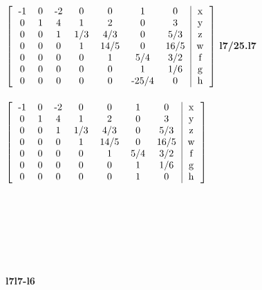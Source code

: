 \documentclass{article}
\begin{document}
\begin{hbox}{

$\left[
\begin{tabular}{ccccccc|c}
-1 & 0 & -2 & 0 & 0 & 1 & 0 & x\\
0 & 1 & 4 & 1 & 2 & 0 & 3 & y\\
0 & 0 & 1 & 1/3 & 4/3 & 0 & 5/3 & z\\
0 & 0 & 0 & 1 & 14/5 & 0 & 16/5 & w\\
0 & 0 & 0 & 0 & 1 & 5/4 & 3/2 & f\\
0 & 0 & 0 & 0 & 0 & 1 & 1/6 & g\\
0 & 0 & 0 & 0 & 0 & -25/4 & 0 & h\\
\end{tabular}
\right]

$
\textbf{l7/25.l7}
\\\\
$\left[
\begin{tabular}{ccccccc|c}
-1 & 0 & -2 & 0 & 0 & 1 & 0 & x\\
0 & 1 & 4 & 1 & 2 & 0 & 3 & y\\
0 & 0 & 1 & 1/3 & 4/3 & 0 & 5/3 & z\\
0 & 0 & 0 & 1 & 14/5 & 0 & 16/5 & w\\
0 & 0 & 0 & 0 & 1 & 5/4 & 3/2 & f\\
0 & 0 & 0 & 0 & 0 & 1 & 1/6 & g\\
0 & 0 & 0 & 0 & 0 & 1 & 0 & h\\
\end{tabular}
\right]\\
$}
\end{hbox}\\
\\\\\\\\\\
\textbf{l7\rightarrow l7-l6}
\end{document}
